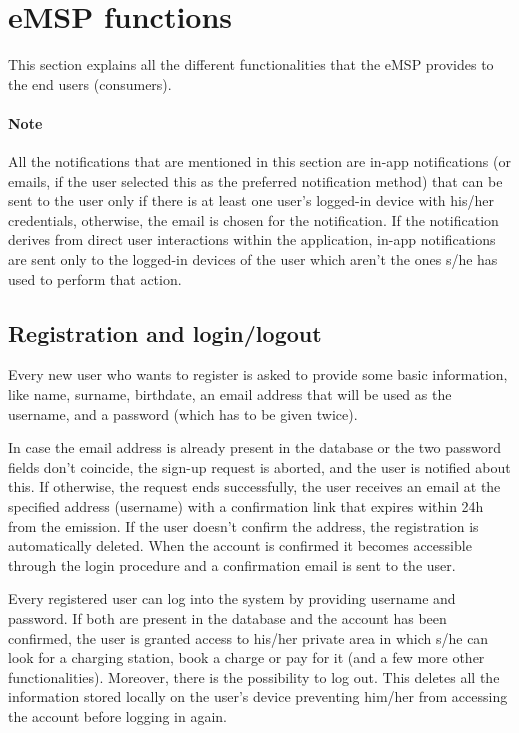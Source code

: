 \pagebreak

\section{eMSP functions}

This section explains all the different functionalities that the eMSP provides to the end users (consumers).

\paragraph{Note} All the notifications that are mentioned in this section are in-app notifications (or emails, if the user selected this as the preferred notification method) that can be sent to the user only if there is at least one user's logged-in device with his/her credentials, otherwise, the email is chosen for the notification. If the notification derives from direct user interactions within the application, in-app notifications are sent only to the logged-in devices of the user which aren't the ones s/he has used to perform that action.

\subsection{Registration and login/logout}

Every new user who wants to register is asked to provide some basic information, like name, surname, birthdate, an email address that will be used as the username, and a password (which has to be given twice).\medskip

In case the email address is already present in the database or the two password fields don't coincide, the sign-up request is aborted, and the user is notified about this. If otherwise, the request ends successfully, the user receives an email at the specified address (username) with a confirmation link that expires within 24h from the emission. If the user doesn't confirm the address, the registration is automatically deleted. When the account is confirmed it becomes accessible through the login procedure and a confirmation email is sent to the user.\medskip

Every registered user can log into the system by providing username and password. If both are present in the database and the account has been confirmed, the user is granted access to his/her private area in which s/he can look for a charging station, book a charge or pay for it (and a few more other functionalities). Moreover, there is the possibility to log out. This deletes all the information stored locally on the user's device preventing him/her from accessing the account before logging in again.

